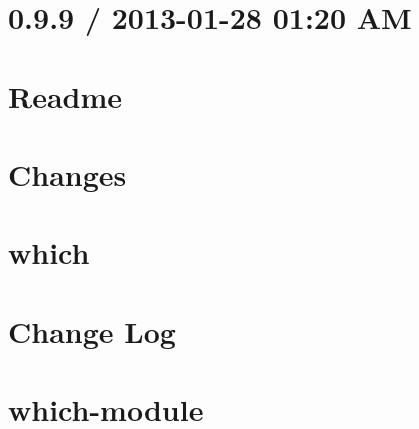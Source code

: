 \documentclass[twoside]{book}
\newcommand{\+}{\discretionary{\mbox{\scriptsize$\hookleftarrow$}}{}{}}
\begin{document}
\chapter{0.9.9 / 2013-\/01-\/28 01\+:20 AM}
\label{md__c_1_workspace_demo_src_main_script_node_modules_whet_8extend__history}

\chapter{Readme}
\label{md__c_1_workspace_demo_src_main_script_node_modules_whet_8extend__readme}

\chapter{Changes}
\label{md__c_1_workspace_demo_src_main_script_node_modules_which__c_h_a_n_g_e_l_o_g}

\chapter{which}
\label{md__c_1_workspace_demo_src_main_script_node_modules_which__r_e_a_d_m_e}

\chapter{Change Log}
\label{md__c_1_workspace_demo_src_main_script_node_modules_which-module__c_h_a_n_g_e_l_o_g}

\chapter{which-\/module}
\label{md__c_1_workspace_demo_src_main_script_node_modules_which-module__r_e_a_d_m_e}

\end{document}

